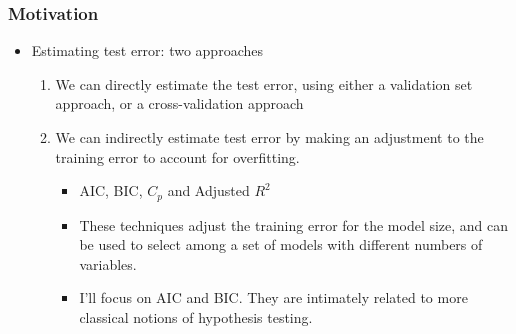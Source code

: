 \documentclass[
  shownotes,
  xcolor={svgnames},
  hyperref={colorlinks,citecolor=DarkBlue,linkcolor=DarkRed,urlcolor=DarkBlue}
  , aspectratio=169]{beamer}
\begin{document}
\begin{frame}[fragile]
\frametitle{Motivation}
\begin{itemize}
\item Estimating test error: two approaches
\medskip
\begin{enumerate}
\item We can directly estimate the test error, using either a validation set approach, or a cross-validation approach
\medskip
\item We can indirectly estimate test error by making an adjustment to the training error to account for overfitting.
\medskip
\begin{itemize}
  \item AIC, BIC, $C_p$ and Adjusted $R^2$
  \medskip
  \item These techniques adjust the training error for the model size, and can be used to select among a set of models with different numbers of variables.
  \medskip
  \item I'll focus on AIC and BIC. They are intimately related to  more classical notions of hypothesis testing. 
\end{itemize}


\end{enumerate}
\end{itemize}

\end{frame}
\end{document}
